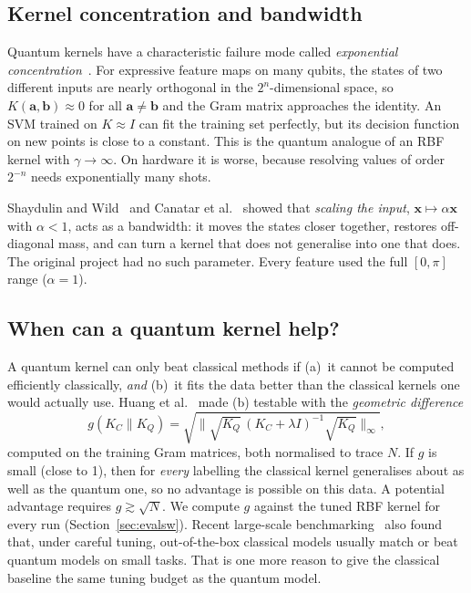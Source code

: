 \subsection{Kernel concentration and bandwidth}
\label{sec:conc}
Quantum kernels have a characteristic failure mode called \emph{exponential concentration}~\cite{thanasilp2024}.
For expressive feature maps on many qubits, the states of two different inputs are nearly
orthogonal in the $2^n$-dimensional space, so $K(\bm a,\bm b)\approx 0$ for all $\bm a\ne\bm b$
and the Gram matrix approaches the identity. An SVM trained on $K\approx I$ can fit the training
set perfectly, but its decision function on new points is close to a constant. This is the
quantum analogue of an RBF kernel with $\gamma\to\infty$. On hardware it is worse, because
resolving values of order $2^{-n}$ needs exponentially many shots.

Shaydulin and Wild~\cite{shaydulin2022} and Canatar et al.~\cite{canatar2022} showed that
\emph{scaling the input}, $\bm x\mapsto\alpha\bm x$ with $\alpha<1$, acts as a bandwidth: it
moves the states closer together, restores off-diagonal mass, and can turn a kernel that does not
generalise into one that does. The original project had no such parameter. Every feature used the
full $[0,\pi]$ range ($\alpha=1$).

\subsection{When can a quantum kernel help?}
\label{sec:gd}
A quantum kernel can only beat classical methods if (a)~it cannot be computed efficiently
classically, \emph{and} (b)~it fits the data better than the classical kernels one would
actually use. Huang et al.~\cite{huang2021} made (b) testable with the \emph{geometric difference}
\begin{equation}
g(K_C\|K_Q)=\sqrt{\big\|\sqrt{K_Q}\,(K_C+\lambda I)^{-1}\sqrt{K_Q}\big\|_\infty},
\label{eq:gd}
\end{equation}
computed on the training Gram matrices, both normalised to trace $N$. If $g$ is small (close to 1),
then for \emph{every} labelling the classical kernel generalises about as well as the quantum one,
so no advantage is possible on this data. A potential advantage requires $g\gtrsim\sqrt N$. We
compute $g$ against the tuned RBF kernel for every run (Section~\ref{sec:evalsw}). Recent
large-scale benchmarking~\cite{bowles2024} also found that, under careful tuning, out-of-the-box
classical models usually match or beat quantum models on small tasks. That is one more reason to
give the classical baseline the same tuning budget as the quantum model.
